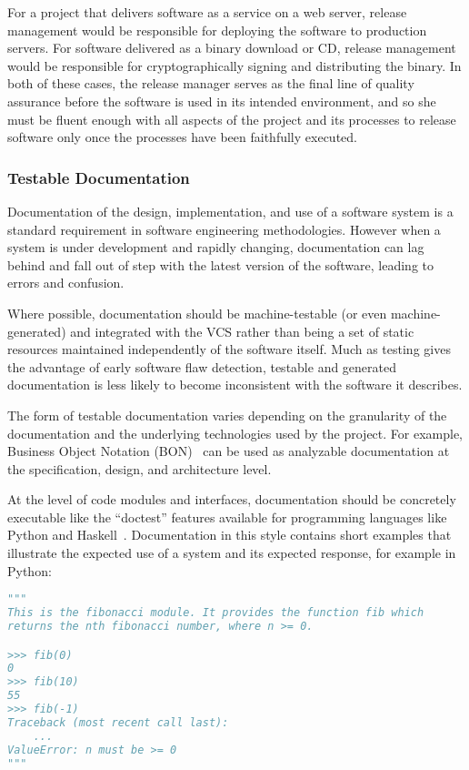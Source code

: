 For a project that delivers software as a service on a web server,
release management would be responsible for deploying the software to
production servers. For software delivered as a binary download or CD,
release management would be responsible for cryptographically signing
and distributing the binary. In both of these cases, the release
manager serves as the final line of quality assurance before the
software is used in its intended environment, and so she must be
fluent enough with all aspects of the project and its processes to
release software only once the processes have been faithfully
executed.

\subsubsection{Testable Documentation}

Documentation of the design, implementation, and use of a software
system is a standard requirement in software engineering
methodologies. However when a system is under development and rapidly
changing, documentation can lag behind and fall out of step with the
latest version of the software, leading to errors and confusion.

Where possible, documentation should be machine-testable (or even
machine-generated) and integrated with the VCS rather than being a set
of static resources maintained independently of the software
itself. Much as testing gives the advantage of early software flaw
detection, testable and generated documentation is less likely to
become inconsistent with the software it describes.

The form of testable documentation varies depending on the granularity
of the documentation and the underlying technologies used by the
project. For example, Business Object Notation
(BON)~\cite{walden1995seamless} can be used as analyzable
documentation at the specification, design, and architecture level.

At the level of code modules and interfaces, documentation should be
concretely executable like the ``doctest'' features available for
programming languages like Python and
Haskell~\cite{python3doctest}. Documentation in this style contains
short examples that illustrate the expected use of a system and its
expected response, for example in Python:

\begin{lstlisting}[language=Python]
"""
This is the fibonacci module. It provides the function fib which
returns the nth fibonacci number, where n >= 0.

>>> fib(0)
0
>>> fib(10)
55
>>> fib(-1)
Traceback (most recent call last):
    ...
ValueError: n must be >= 0
"""
\end{lstlisting}

